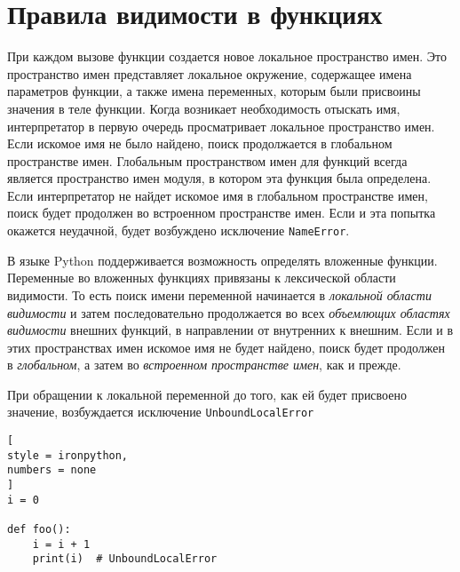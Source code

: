 \documentclass[%
	11pt,
	a4paper,
	utf8,
		]{article}
\begin{document}


\section{Правила видимости в функциях}

При каждом вызове функции создается новое локальное пространство имен. Это пространство имен представляет локальное окружение, содержащее имена параметров функции, а также имена переменных, которым были присвоины значения в теле функции. Когда возникает необходимость отыскать имя, интерпретатор в первую очередь просматривает локальное пространство имен. Если искомое имя не было найдено, поиск продолжается в глобальном пространстве имен. Глобальным пространством имен для функций всегда является пространство имен модуля, в котором эта функция была определена. Если интерпретатор не найдет искомое имя в глобальном пространстве имен, поиск будет продолжен во встроенном пространстве имен. Если и эта попытка окажется неудачной, будет возбуждено исключение \texttt{NameError}.

В языке Python поддерживается возможность определять вложенные функции. Переменные во вложенных функциях привязаны к лексической области видимости. То есть поиск имени переменной начинается в \emph{локальной области видимости} и затем последовательно продолжается во всех \emph{объемлющих областях видимости} внешних функций, в направлении от внутренних к внешним. Если и в этих пространствах имен искомое имя не будет найдено, поиск будет продолжен в \emph{глобальном}, а затем во \emph{встроенном пространстве имен}, как и прежде.

При обращении к локальной переменной до того, как ей будет присвоено значение, возбуждается исключение \texttt{UnboundLocalError}
\begin{lstlisting}[
style = ironpython,
numbers = none	
]
i = 0

def foo():
    i = i + 1
    print(i)  # UnboundLocalError
\end{lstlisting}
\end{document}
